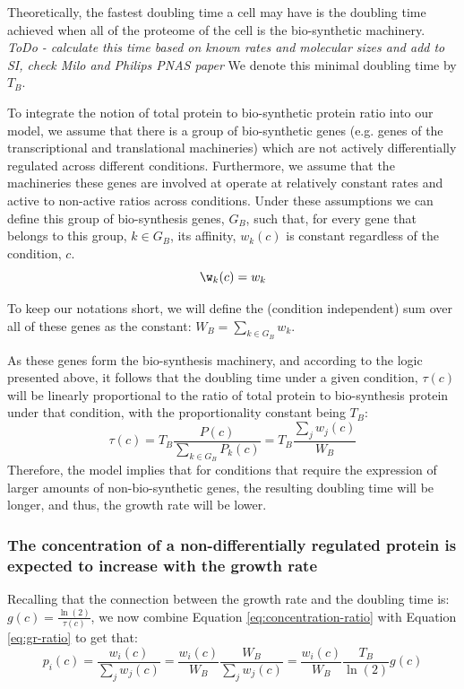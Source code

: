 \documentclass[notitlepage]{article}
\begin{document}
Theoretically, the fastest doubling time a cell may have is the doubling time achieved when all of the proteome of the cell is the bio-synthetic machinery.
\emph{ToDo - calculate this time based on known rates and molecular sizes and add to SI, check Milo and Philips PNAS paper}
We denote this minimal doubling time by $T_B$.

To integrate the notion of total protein to bio-synthetic protein ratio into our model, we assume that there is a group of bio-synthetic genes (e.g. genes of the transcriptional and translational machineries) which are not actively differentially regulated across different conditions.
Furthermore, we assume that the machineries these genes are involved at operate at relatively constant rates and active to non-active ratios across conditions.
Under these assumptions we can define this group of bio-synthesis genes, $G_B$, such that, for every gene that belongs to this group, $k \in G_B$, its affinity, $w_k(c)$ is constant regardless of the condition, $c$.
\begin{equation}
  \label{eq:biosynth-def}
  \w_k(c)=w_k
\end{equation}

To keep our notations short, we will define the (condition independent) sum over all of these genes as the constant: $W_B = \sum_{k\in G_B}w_k$.

As these genes form the bio-synthesis machinery, and according to the logic presented above, it follows that the doubling time under a given condition, $\tau(c)$ will be linearly proportional to the ratio of total protein to bio-synthesis protein under that condition, with the proportionality constant being $T_B$:
\begin{equation}
  \label{eq:gr-ratio}
  \tau(c) = T_B\frac{P(c)}{\sum_{k\in G_B}P_k(c)}=T_B\frac{\sum_jw_j(c)}{W_B}
\end{equation}
Therefore, the model implies that for conditions that require the expression of larger amounts of non-bio-synthetic genes, the resulting doubling time will be longer, and thus, the growth rate will be lower.

\subsubsection{The concentration of a non-differentially regulated protein is expected to increase with the growth rate} 
Recalling that the connection between the growth rate and the doubling time is: $g(c)=\frac{\ln(2)}{\tau(c)}$, we now combine Equation \ref{eq:concentration-ratio} with Equation \ref{eq:gr-ratio} to get that:
\begin{equation}
  \label{eq:default-response}
  p_i(c)=\frac{w_i(c)}{\sum_jw_j(c)}=\frac{w_i(c)}{W_B}\frac{W_B}{\sum_jw_j(c)}=\frac{w_i(c)}{W_B}\frac{T_B}{\ln(2)}g(c)
\end{equation}
\end{document}
